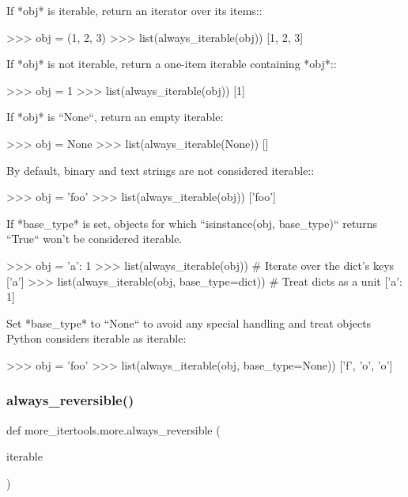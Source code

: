 \begin{DoxyVerb}If *obj* is iterable, return an iterator over its items::

    >>> obj = (1, 2, 3)
    >>> list(always_iterable(obj))
    [1, 2, 3]

If *obj* is not iterable, return a one-item iterable containing *obj*::

    >>> obj = 1
    >>> list(always_iterable(obj))
    [1]

If *obj* is ``None``, return an empty iterable:

    >>> obj = None
    >>> list(always_iterable(None))
    []

By default, binary and text strings are not considered iterable::

    >>> obj = 'foo'
    >>> list(always_iterable(obj))
    ['foo']

If *base_type* is set, objects for which ``isinstance(obj, base_type)``
returns ``True`` won't be considered iterable.

    >>> obj = {'a': 1}
    >>> list(always_iterable(obj))  # Iterate over the dict's keys
    ['a']
    >>> list(always_iterable(obj, base_type=dict))  # Treat dicts as a unit
    [{'a': 1}]

Set *base_type* to ``None`` to avoid any special handling and treat objects
Python considers iterable as iterable:

    >>> obj = 'foo'
    >>> list(always_iterable(obj, base_type=None))
    ['f', 'o', 'o']
\end{DoxyVerb}
 \mbox{\label{namespacemore__itertools_1_1more_a21d1b430f90e2813049a38e20276a92b}} 
\subsubsection{\texorpdfstring{always\+\_\+reversible()}{always\_reversible()}}
{\footnotesize\ttfamily def more\+\_\+itertools.\+more.\+always\+\_\+reversible (\begin{DoxyParamCaption}\item[{}]{iterable }\end{DoxyParamCaption})}

